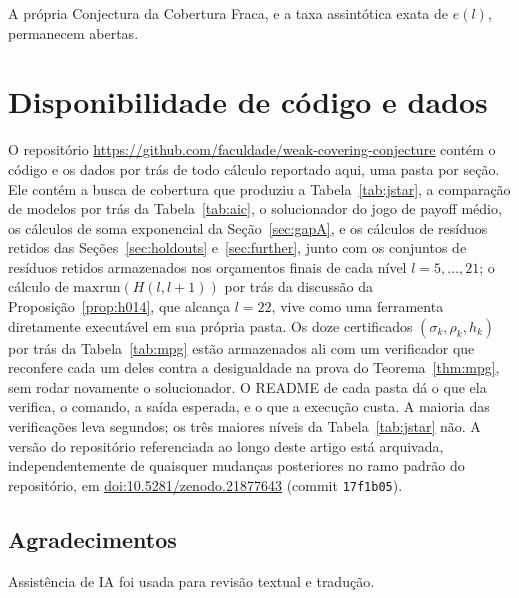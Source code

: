 \documentclass[11pt]{amsart}
\theoremstyle{plain}
\theoremstyle{definition}
\theoremstyle{remark}
\begin{document}
A própria Conjectura da Cobertura Fraca, e a taxa assintótica exata de $e(l)$, permanecem abertas.

\section{Disponibilidade de código e dados}
\label{sec:code}

O repositório \url{https://github.com/faculdade/weak-covering-conjecture} contém o código e os
dados por trás de todo cálculo reportado aqui, uma pasta por seção. Ele contém a busca de cobertura
que produziu a Tabela~\ref{tab:jstar}, a comparação de modelos por trás da Tabela~\ref{tab:aic}, o
solucionador do jogo de payoff médio, os cálculos de soma exponencial da Seção~\ref{sec:gapA}, e os
cálculos de resíduos retidos das Seções~\ref{sec:holdouts} e~\ref{sec:further}, junto com os
conjuntos de resíduos retidos armazenados nos orçamentos finais de cada nível $l=5,\dots,21$; o
cálculo de $\mathrm{maxrun}(H(l,l+1))$ por trás da discussão da Proposição~\ref{prop:h014}, que
alcança $l=22$, vive como uma ferramenta diretamente executável em sua própria pasta. Os doze
certificados $(\sigma_k,\rho_k,h_k)$ por trás da Tabela~\ref{tab:mpg} estão armazenados ali com um
verificador que reconfere cada um deles contra a desigualdade na prova do Teorema~\ref{thm:mpg},
sem rodar novamente o solucionador. O README de cada pasta dá o que ela verifica, o comando, a
saída esperada, e o que a execução custa. A maioria das verificações leva segundos; os três maiores
níveis da Tabela~\ref{tab:jstar} não. A versão do repositório referenciada ao longo deste artigo
está arquivada, independentemente de quaisquer mudanças posteriores no ramo padrão do repositório,
em \href{https://doi.org/10.5281/zenodo.21877643}{doi:10.5281/zenodo.21877643} (commit
\texttt{17f1b05}).

\subsection*{Agradecimentos}
Assistência de IA foi usada para revisão textual e tradução.
\end{document}
